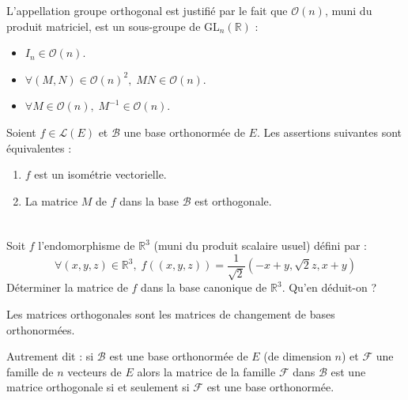 \documentclass[a4paper,10pt]{report}
\begin{document}
\noindent L'appellation groupe orthogonal est justifié par le fait que $\mathcal{O}(n)$, muni du produit matriciel, est un sous-groupe de $\textrm{GL}_n(\mathbb{R})$ :

\begin{prop} 
\begin{itemize}
\item $I_n \in \mathcal{O}(n)$.
\item $\forall (M,N) \in \mathcal{O}(n)^2, \; MN \in \mathcal{O}(n)$.
\item $\forall M \in \mathcal{O}(n), \; M^{-1} \in \mathcal{O}(n)$.
\end{itemize}
\end{prop}

\begin{preuve}
\vspace{5cm}
\end{preuve}

\begin{prop}
Soient $f \in \mathcal{L}(E)$ et $\mathcal{B}$ une base orthonormée de $E$.  Les assertions suivantes sont équivalentes :
\begin{enumerate}
\item $f$ est un isométrie vectorielle.
\item La matrice $M$ de $f$ dans la base $\mathcal{B}$ est orthogonale.
\end{enumerate}
\end{prop}

\begin{preuve}
\vspace{5cm}
\end{preuve}

\newpage

$\phantom{test}$

\vspace{5cm}

\begin{ex} Soit $f$ l'endomorphisme de $\mathbb{R}^3$ (muni du produit scalaire usuel) défini par :
$$ \forall (x,y,z) \in \mathbb{R}^3, \; f((x,y,z)) = \dfrac{1}{\sqrt{2}} (-x+y , \sqrt{2}z, x+y)$$
Déterminer la matrice de $f$ dans la base canonique de $\mathbb{R}^3$. Qu'en déduit-on ?


\vspace{5cm}

\end{ex}

\begin{prop} Les matrices orthogonales sont les matrices de changement de bases orthonormées. 

\noindent Autrement dit : si $\mathcal{B}$ est une base orthonormée de $E$ (de dimension $n$) et $\mathcal{F}$ une famille de $n$ vecteurs de $E$ alors la matrice de la famille $\mathcal{F}$ dans $\mathcal{B}$ est une matrice orthogonale si et seulement si $\mathcal{F}$ est une base orthonormée.
\end{prop}
\end{document}

